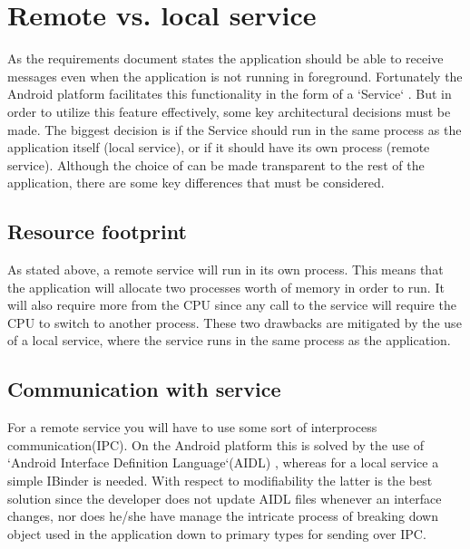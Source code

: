 

\section{Remote vs. local service}

As the requirements document states the application should be able to receive messages even when the application is not running in foreground. Fortunately the Android platform facilitates this functionality in the form of a `Service` \cite{bib:service}. But in order to utilize this feature effectively, some key architectural decisions must be made. The biggest decision is if the Service should run in the same process as the application itself (local service), or if it should have its own process (remote service). Although the choice of can be made transparent to the rest of the application, there are some key differences that must be considered.

\subsection{Resource footprint}
As stated above, a remote service will run in its own process. This means that the application will allocate two processes worth of memory in order to run. It will also require more from the CPU since any call to the service will require the CPU to switch to another process. These two drawbacks are mitigated by the use of a local service, where the service runs in the same process as the application. 

\subsection{Communication with service}
For a remote service you will have to use some sort of  interprocess communication(IPC). On the Android platform this is solved by the use of `Android Interface Definition Language`(AIDL) \cite{bib:aidl}, whereas for a local service a simple IBinder \cite{bib:ibinder} is needed. With respect to modifiability the latter is the best solution since the developer does not update AIDL files whenever an interface changes, nor does he/she have manage the intricate process of breaking down object used in the application down to primary types for sending over IPC.





